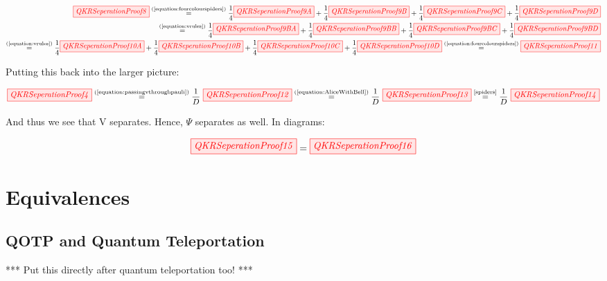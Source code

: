 \documentclass[]{article}
\newcommand{\equaltext}[1]{\ensuremath{\stackrel{\text{#1}}{=}}}
\begin{document}
\begin{equation}
\label{equation:passingvthroughpauli}
\begin{aligned}
	 \tikzfig{QKRSeperationProof8} \equaltext{(\ref{equation:fourcolourspiders})} \frac{1}{4}\tikzfig{QKRSeperationProof9A} + \frac{1}{4} \tikzfig{QKRSeperationProof9B} + \frac{1}{4} \tikzfig{QKRSeperationProof9C} + \frac{1}{4} \tikzfig{QKRSeperationProof9D} \\ \equaltext{(\ref{equation:vrules})}
	 \frac{1}{4}\tikzfig{QKRSeperationProof9BA} + \frac{1}{4} \tikzfig{QKRSeperationProof9BB} + \frac{1}{4} \tikzfig{QKRSeperationProof9BC} + \frac{1}{4} \tikzfig{QKRSeperationProof9BD} \\
	 \equaltext{(\ref{equation:vrules})}
	  \frac{1}{4}\tikzfig{QKRSeperationProof10A} + \frac{1}{4} \tikzfig{QKRSeperationProof10B} + \frac{1}{4} \tikzfig{QKRSeperationProof10C} + \frac{1}{4} \tikzfig{QKRSeperationProof10D} \equaltext{(\ref{equation:fourcolourspiders})} \tikzfig{QKRSeperationProof11}
\end{aligned}
\end{equation}

Putting this back into the larger picture:

\begin{equation}
	\label{equation:vpassingthrough}
	\tikzfig{QKRSeperationProof4} \equaltext{(\ref{equation:passingvthroughpauli})} \frac{1}{D}~ \tikzfig{QKRSeperationProof12} \equaltext{(\ref{equation:AliceWithBell})}	\frac{1}{D}~ \tikzfig{QKRSeperationProof13} \equaltext{\ref{spiders}} \frac{1}{D}~ \tikzfig{QKRSeperationProof14}
\end{equation}

And thus we see that V separates. Hence, $\Psi$ separates as well. In diagrams:

\begin{equation}
\tikzfig{QKRSeperationProof15} = \tikzfig{QKRSeperationProof16}
\end{equation}

\section{Equivalences}
\label{Equivalences}

\subsection{QOTP and Quantum Teleportation}

*** Put this directly after quantum teleportation too! ***
\end{document}
